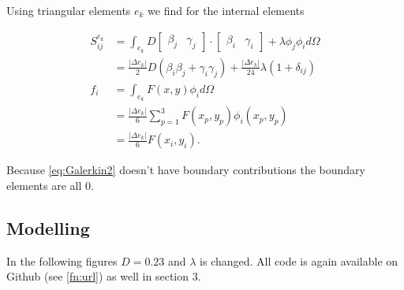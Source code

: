 \documentclass[10pt,a4paper]{article}
\begin{document}
Using triangular elements $e_k$ we find for the internal elements 

\begin{equation}
\begin{split}
S_{ij}^{e_k} &= \int_{e_k} D 
\begin{bmatrix}
\beta_j & \gamma_j
\end{bmatrix} \cdot 
\begin{bmatrix}
\beta_i & \gamma_i
\end{bmatrix} + \lambda \phi_j \phi_i d\Omega \\
&= \frac{|\Delta e_k|}{2} D \left( \beta_i \beta_j + \gamma_i \gamma_j \right) + \frac{|\Delta e_k |}{24} \lambda \left( 1 + \delta_{ij} \right) \\
f_i &= \int_{e_k} F(x,y) \phi_i d\Omega \\
&= \frac{|\Delta e_k|}{6} \sum_{p=1}^3 F(x_p,y_p) \phi_i(x_p,y_p) \\
&= \frac{|\Delta e_k|}{6} F(x_i,y_i).
\end{split}
\end{equation}

Because \cref{eq:Galerkin2} doesn't have boundary contributions the boundary elements are all $0$.

\subsection{Modelling}
In the following figures $D=0.23$ and $\lambda$ is changed. All code is again available on Github (see \cref{fn:url}) as well in section 3.
\end{document}
